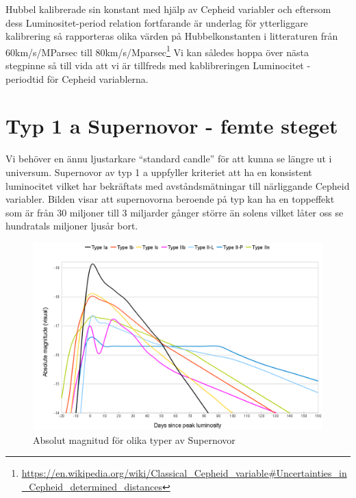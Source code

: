 \documentclass[./exercises.tex]{subfiles}
\begin{document}
Hubbel kalibrerade sin konstant med hjälp av Cepheid variabler och eftersom dess Luminositet-period relation
fortfarande är underlag för ytterliggare kalibrering så rapporteras olika värden på Hubbelkonstanten i litteraturen
från 60km/s/MParsec till 80km/s/Mparsec\footnote{\url{https://en.wikipedia.org/wiki/Classical_Cepheid_variable\#Uncertainties_in_Cepheid_determined_distances}}
Vi kan således hoppa över nästa stegpinne så till vida att vi är tillfreds med kablibreringen Luminocitet - periodtid för Cepheid variablerna.


\section{Typ 1 a Supernovor - femte steget}
Vi behöver en ännu ljustarkare ``standard candle'' för att kunna se längre ut i universum.
Supernovor av typ 1 a uppfyller kriteriet att ha en konsistent luminocitet vilket har
bekräftats med avståndsmätningar till närliggande Cepheid variabler.
Bilden visar att supernovorna beroende på typ kan ha en toppeffekt som är från 30 miljoner till
3 miljarder gånger större än solens vilket låter oss se hundratals miljoner ljusår bort.
\begin{figure}[H]
\begin{center}
  \includegraphics[scale=0.25]{Supernova.png}
  \caption{Absolut magnitud för olika typer av Supernovor }
  \end{center}
  \label{fig4}
\end{figure}
\end{document}
